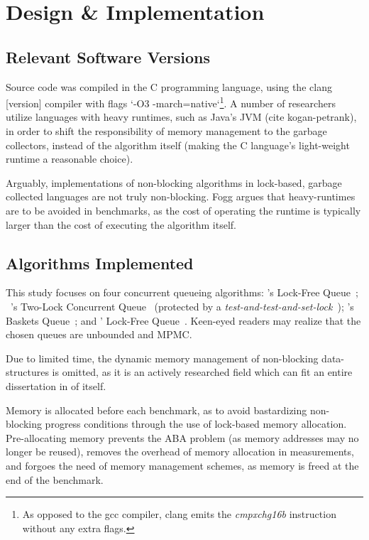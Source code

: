 \chapter{Design \& Implementation}

\section{Relevant Software Versions}
Source code was compiled in the C programming language, using the clang
[version] compiler with flags `-O3 -march=native`\footnote{As opposed to the
gcc compiler, clang emits the \emph{cmpxchg16b} instruction without any extra flags.}. A number of researchers
utilize languages with heavy runtimes, such as Java's JVM (cite kogan-petrank),
in order to shift the responsibility of memory management to the garbage
collectors, instead of the algorithm itself (making the C language's
light-weight runtime a reasonable choice).

Arguably, implementations of non-blocking algorithms in lock-based, garbage
collected languages are not truly non-blocking. Fogg argues that heavy-runtimes
are to be avoided in benchmarks, as the cost of operating the runtime is
typically larger than the cost of executing the algorithm itself.

\section{Algorithms Implemented}
This study focuses on four concurrent queueing algorithms:
\citeauthor{michael1996simple}'s Lock-Free Queue~\citep{michael1996simple};
~\citeauthor{michael1996simple}'s Two-Lock Concurrent
Queue~\citep{michael1996simple} (protected by a \emph{test-and-test-and-set-lock}~\citep{mellor1991algorithms}); \citeauthor{hoffman2007baskets}'s Baskets
Queue~\citep{hoffman2007baskets}; and \citeauthor{valois1994queues}' Lock-Free
Queue~\citep{valois1994queues}. Keen-eyed readers may realize that the chosen
queues are unbounded and MPMC.

Due to limited time, the dynamic memory management of non-blocking
data-structures is omitted, as it is an actively researched field which can fit
an entire dissertation in of itself.

Memory is allocated before each benchmark, as to avoid bastardizing
non-blocking progress conditions through the use of lock-based memory
allocation. Pre-allocating memory prevents the ABA problem (as memory addresses may no
longer be reused), removes the overhead of memory allocation in measurements,
and forgoes the need of memory management schemes, as memory is freed at the end
of the benchmark.

